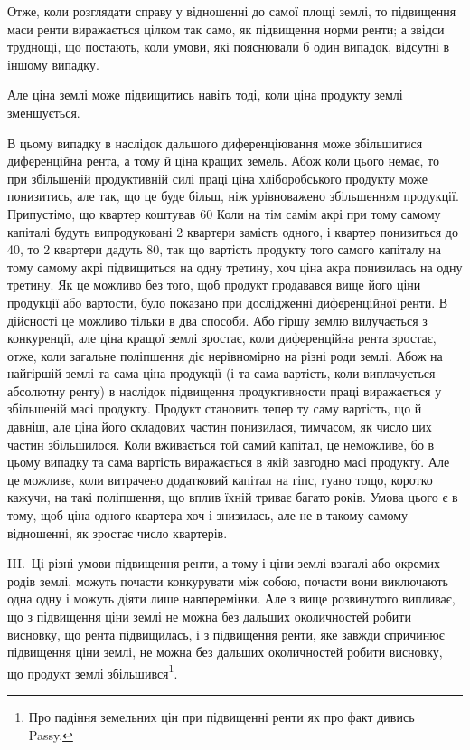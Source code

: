 Отже, коли розглядати справу у відношенні до самої площі землі, то підвищення
маси ренти виражається цілком так само, як підвищення норми ренти;
а звідси труднощі, що постають, коли умови, які пояснювали б один випадок,
відсутні в іншому випадку.

Але ціна землі може підвищитись навіть тоді, коли ціна продукту землі
зменшується.

В цьому випадку в наслідок дальшого диференціювання може збільшитися
диференційна рента, а тому й ціна кращих земель. Абож коли цього немає, то
при збільшеній продуктивній силі праці ціна хліборобського продукту може понизитись,
але так, що це буде більш, ніж урівноважено збільшенням продукції. Припустімо,
що квартер коштував 60 Коли на тім самім акрі при тому самому
капіталі будуть випродуковані 2 квартери замість одного, і квартер понизиться
до 40, то 2 квартери дадуть 80, так що вартість продукту того самого
капіталу на тому самому акрі підвищиться на одну третину, хоч ціна акра
понизилась на одну третину. Як це можливо без того, щоб продукт продавався
вище його ціни продукції або вартости, було показано при дослідженні диференційної
ренти. В дійсності це можливо тільки в два способи. Або гіршу
землю вилучається з конкуренції, але ціна кращої землі зростає, коли
диференційна рента зростає, отже, коли загальне поліпшення діє нерівномірно
на різні роди землі. Абож на найгіршій землі та сама ціна продукції
(і та сама вартість, коли виплачується абсолютну ренту) в наслідок підвищення
продуктивности праці виражається у збільшеній масі продукту. Продукт
становить тепер ту саму вартість, що й давніш, але ціна його складових
частин понизилася, тимчасом, як число цих частин збільшилося. Коли вживається
той самий капітал, це неможливе, бо в цьому випадку та сама вартість
виражається в якій завгодно масі продукту. Але це можливе, коли витрачено
додатковий капітал на гіпс, гуано тощо, коротко кажучи, на такі поліпшення,
що вплив їхній триває багато років. Умова цього є в тому, щоб ціна одного квартера
хоч і знизилась, але не в такому самому відношенні, як зростає число квартерів.

III.~Ці різні умови підвищення ренти, а тому і ціни землі взагалі або окремих
родів землі, можуть почасти конкурувати між собою, почасти вони виключають
одна одну і можуть діяти лише навперемінки. Але з вище розвинутого випливає,
що з підвищення ціни землі не можна без дальших околичностей робити
висновку, що рента підвищилась, і з підвищення ренти, яке завжди спричинює
підвищення ціни землі, не можна без дальших околичностей робити висновку,
що продукт землі збільшився\footnote{
Про падіння земельних цін при підвищенні ренти як про факт дивись Passy.
}.

